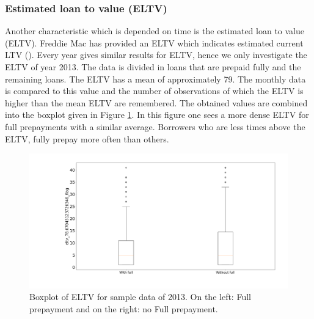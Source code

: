     \subsubsection{Estimated loan to value (ELTV)}
    Another characteristic which is depended on time is the
    estimated loan to value (ELTV). Freddie Mac has provided an
    ELTV which
    indicates estimated current LTV
    (\cite{FredieMac}). Every year gives similar results for ELTV,
    hence we only investigate the ELTV of year 2013. The data
    is divided in loans that are prepaid fully and the
    remaining loans. The ELTV has a mean of
    approximately 79. The monthly data is compared to
    this value and the number of observations of which
    the ELTV is higher than the mean ELTV are
    remembered. The obtained values are combined into
    the boxplot given in Figure
    \ref{Model_boxplot_eltv_2013}. In this figure one sees a more
    dense ELTV for full prepayments with a similar average. 
    Borrowers who are less times above the ELTV, fully prepay more often than others. 
    
    \begin{figure}[H]
        \centering
        \includegraphics[width=\linewidth]{Figures/eltv_2013.png}
        \caption{Boxplot of ELTV for sample data of 2013.  On the left: Full prepayment and on the right: no Full prepayment.}
        \label{Model_boxplot_eltv_2013}
    \end{figure}
    
